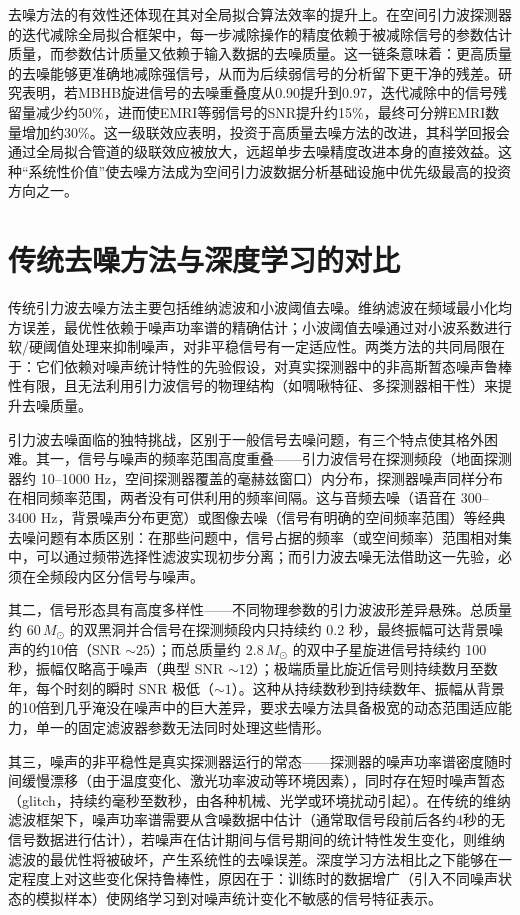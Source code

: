 去噪方法的有效性还体现在其对全局拟合算法效率的提升上。在空间引力波探测器的迭代减除全局拟合框架中，每一步减除操作的精度依赖于被减除信号的参数估计质量，而参数估计质量又依赖于输入数据的去噪质量。这一链条意味着：更高质量的去噪能够更准确地减除强信号，从而为后续弱信号的分析留下更干净的残差。研究表明，若MBHB旋进信号的去噪重叠度从0.90提升到0.97，迭代减除中的信号残留量减少约50\%，进而使EMRI等弱信号的SNR提升约15\%，最终可分辨EMRI数量增加约30\%。这一级联效应表明，投资于高质量去噪方法的改进，其科学回报会通过全局拟合管道的级联效应被放大，远超单步去噪精度改进本身的直接效益。这种“系统性价值”使去噪方法成为空间引力波数据分析基础设施中优先级最高的投资方向之一。

\section{传统去噪方法与深度学习的对比}

传统引力波去噪方法主要包括维纳滤波和小波阈值去噪。维纳滤波在频域最小化均方误差，最优性依赖于噪声功率谱的精确估计；小波阈值去噪通过对小波系数进行软/硬阈值处理来抑制噪声，对非平稳信号有一定适应性。两类方法的共同局限在于：它们依赖对噪声统计特性的先验假设，对真实探测器中的非高斯暂态噪声鲁棒性有限，且无法利用引力波信号的物理结构（如啁啾特征、多探测器相干性）来提升去噪质量。

引力波去噪面临的独特挑战，区别于一般信号去噪问题，有三个特点使其格外困难。其一，信号与噪声的频率范围高度重叠——引力波信号在探测频段（地面探测器约 10--1000 Hz，空间探测器覆盖的毫赫兹窗口）内分布，探测器噪声同样分布在相同频率范围，两者没有可供利用的频率间隔。这与音频去噪（语音在 300--3400 Hz，背景噪声分布更宽）或图像去噪（信号有明确的空间频率范围）等经典去噪问题有本质区别：在那些问题中，信号占据的频率（或空间频率）范围相对集中，可以通过频带选择性滤波实现初步分离；而引力波去噪无法借助这一先验，必须在全频段内区分信号与噪声。

其二，信号形态具有高度多样性——不同物理参数的引力波波形差异悬殊。总质量约 $60\,M_\odot$ 的双黑洞并合信号在探测频段内只持续约 0.2 秒，最终振幅可达背景噪声的约10倍（SNR $\sim 25$）；而总质量约 $2.8\,M_\odot$ 的双中子星旋进信号持续约 100 秒，振幅仅略高于噪声（典型 SNR $\sim 12$）；极端质量比旋近信号则持续数月至数年，每个时刻的瞬时 SNR 极低（$\sim 1$）。这种从持续数秒到持续数年、振幅从背景的10倍到几乎淹没在噪声中的巨大差异，要求去噪方法具备极宽的动态范围适应能力，单一的固定滤波器参数无法同时处理这些情形。

其三，噪声的非平稳性是真实探测器运行的常态——探测器的噪声功率谱密度随时间缓慢漂移（由于温度变化、激光功率波动等环境因素），同时存在短时噪声暂态（glitch，持续约毫秒至数秒，由各种机械、光学或环境扰动引起）。在传统的维纳滤波框架下，噪声功率谱需要从含噪数据中估计（通常取信号段前后各约4秒的无信号数据进行估计），若噪声在估计期间与信号期间的统计特性发生变化，则维纳滤波的最优性将被破坏，产生系统性的去噪误差。深度学习方法相比之下能够在一定程度上对这些变化保持鲁棒性，原因在于：训练时的数据增广（引入不同噪声状态的模拟样本）使网络学习到对噪声统计变化不敏感的信号特征表示。


